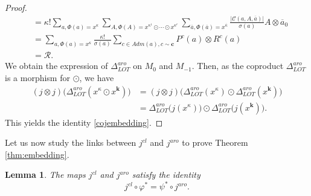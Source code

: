 \documentclass[a4paper,11pt]{article}
\newtheorem{lemma}[theorem]{Lemma}
\begin{document}
\begin{proof}
\begin{align*}
& = \kappa!\sum_{a, \Phi(a)=x^{\kappa}}
\sum_{A, \Phi(A)=x^{\kappa^1}\odot \cdots\odot  x^{\kappa^r}}\sum_{\overline{a}, \Phi(\overline{a})=x^{\overline{\kappa}}}\frac{\vert \mathcal C(a, A, \overline{a})\vert}{\sigma(a)}A\otimes \overline{a}_0\\
& = \sum_{a, \Phi(a)=x^{\kappa}}\frac{\kappa!}{\sigma(a)}\sum_{c\in Adm(a), c\sim \mathbf c}P^{c}(a)\otimes R^{c}(a)\\
& = \mathcal R.
\end{align*}
We obtain the expression of $\Delta_{LOT}^{aro}$ on $M_0$ and $M_{-1}$. Then, as the coproduct $\Delta_{LOT}^{aro}$ is a morphism for $\odot$, we have
\begin{align*}
(j\otimes j)\big(\Delta_{LOT}^{aro}(x^\kappa \odot x^{\mathbf k})\big) & = (j\otimes j)\big(\Delta_{LOT}^{aro}(x^\kappa)\odot \Delta_{LOT}^{aro}(x^{\mathbf k})\big)\\
& = \Delta_{LOT}^{aro}\big(j(x^\kappa)\big)\odot \Delta_{LOT}^{aro}\big(j(x^{\mathbf k})\big).
\end{align*}
This yields the identity \eqref{cojembedding}.
\end{proof}


Let us now study the links between $j^{cl}$ and $j^{aro}$ to prove Theorem \ref{thm:embedding}.
\begin{lemma}
\label{lemma:compatibility_j_maps}
The maps $j^{cl}$ and $j^{aro}$ satisfy the identity
\[j^{cl}\circ\varphi^*=\psi^* \circ j^{aro}.\]
\end{lemma}
\end{document}
